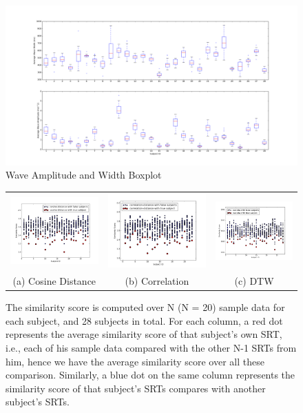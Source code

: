 \begin{figure}
\includegraphics[width=\columnwidth]{figure/width_amp_box.png}
\caption{\label{fig:width_amp} Wave Amplitude and Width Boxplot}
\end{figure}

\begin{figure}[t]
\begin{center}
\begin{tabular}{ccc}
\includegraphics [width=.33\linewidth]{figure/resp_time_cos.png}&
\includegraphics [width=.33\linewidth]{figure/resp_time_cor.png}&
\includegraphics [width=.33\linewidth]{figure/resp_time_dtw.png}\\
(a) Cosine Distance & (b) Correlation & (c) DTW \\
\end{tabular}
\end{center}
\caption{\label{fig:distance} The similarity score is computed over N (N = 20) sample data for each subject, and 28 subjects in total. For each column, a red dot represents the average similarity score of that subject's own SRT, i.e., each of his sample data compared with the other N-1 SRTs from him, hence we have the average similarity score over all these comparison. Similarly, a blue dot on the same column represents the similarity score of that subject's SRTs compares with another subject's SRTs.}
\vspace{-2pt}
\end{figure}


